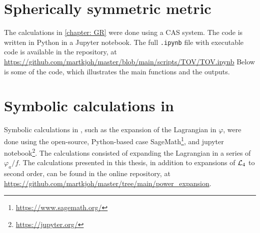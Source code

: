  


\section{Spherically symmetric metric}

The calculations in \autoref{chapter: GR} were done using a CAS system.
The code is written in Python in a Jupyter notebook.
The full \texttt{.ipynb} file with executable code is available in the repository, at \url{https://github.com/martkjoh/master/blob/main/scripts/TOV/TOV.ipynb}
Below is some of the code, which illustrates the main functions and the outputs.






\section{Symbolic calculations in \chpt}
\label{section: symbolic calculations}

Symbolic calculations in \chpt, such as the expansion of the Lagrangian in $\varphi$, were done using the open-source, Python-based case SageMath\footnote{\url{https://www.sagemath.org/}}, and jupyter notebook\footnote{\url{https://jupyter.org/}}.
The calculations consisted of expanding the Lagrangian in a series of $\varphi_a/f$.
The calculations presented in this thesis, in addition to expansions of $\mathcal{L}_4$ to second order, can be found in the online repository, at \url{https://github.com/martkjoh/master/tree/main/power_expansion}.

